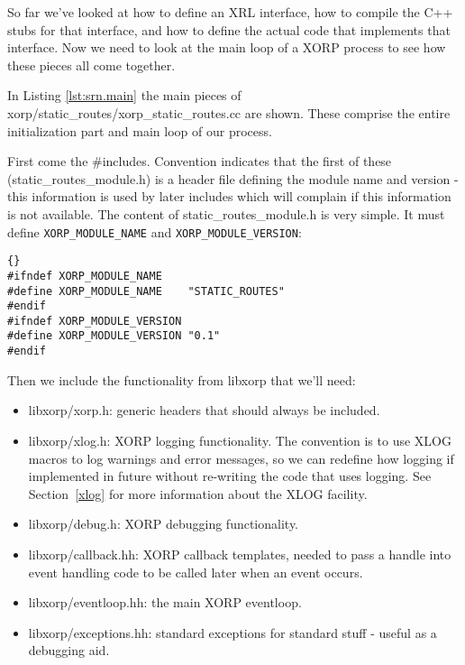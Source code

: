 \documentclass[11pt]{article}
\begin{document}
So far we've looked at how to define an XRL interface, how to compile
the C++ stubs for that interface, and how to define the actual
code that implements that interface.  Now we need to look at the main
loop of a XORP process to see how these pieces all come together.

In Listing \ref{lst:srn.main} the main pieces of {\stt
xorp/static\_routes/xorp\_static\_routes.cc} are shown.  These
comprise the entire initialization part and main loop of our \SRI
process.

First come the \#includes. Convention indicates that the first
of these ({\stt static\_routes\_module.h}) is a header file defining the
module name and version - this
information is used by later includes which will complain if this
information is not available. The content of {\stt static\_routes\_module.h}
is very simple. It must define \verb=XORP_MODULE_NAME= and
\verb=XORP_MODULE_VERSION=:

\begin{lstlisting}[caption={Listing of {\stt xorp/static\_routes/static\_routes\_module.h} %
                                     \label{lst:srn.module} } ]{}
#ifndef XORP_MODULE_NAME
#define XORP_MODULE_NAME	"STATIC_ROUTES"
#endif
#ifndef XORP_MODULE_VERSION
#define XORP_MODULE_VERSION	"0.1"
#endif
\end{lstlisting}


Then we include the functionality from
{\stt libxorp} that we'll need:

\begin{itemize}

  \item {\stt libxorp/xorp.h}: generic headers that should always be included.
  \item {\stt libxorp/xlog.h}: XORP logging functionality.  The convention is
  to use XLOG macros to log warnings and error messages, so we can
  redefine how logging if implemented in future without re-writing
  the code that uses logging. See Section~\ref{xlog} for more information
  about the XLOG facility.

  \item {\stt libxorp/debug.h}: XORP debugging functionality.

  \item {\stt libxorp/callback.hh}: XORP callback templates, needed to pass a
  handle into event handling code to be called later when an event
  occurs.

  \item {\stt libxorp/eventloop.hh}: the main XORP eventloop.

  \item {\stt libxorp/exceptions.hh}: standard exceptions for standard stuff -
  useful as a debugging aid.

\end{itemize}
\end{document}
